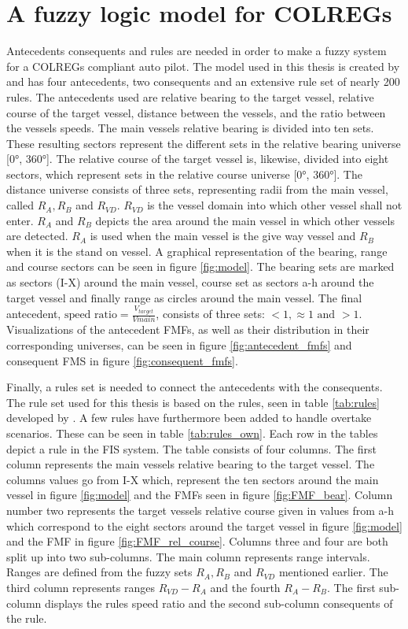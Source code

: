 \section{A fuzzy logic model for COLREGs}
\label{section:model}
Antecedents consequents and rules are needed in order to make a fuzzy system for a COLREGs compliant auto pilot. The model used in this thesis is created by \textcite{perera2012intelligent} and has four antecedents, two consequents and an extensive rule set of nearly 200 rules. The antecedents used are relative bearing to the target vessel, relative course of the target vessel, distance between the vessels, and the ratio between the vessels speeds. The main vessels relative bearing is divided into ten sets. These resulting sectors represent the different sets in the relative bearing universe [\ang{0}, \ang{360}]. The relative course of the target vessel is, likewise, divided into eight sectors, which represent sets in the relative course universe [\ang{0}, \ang{360}]. The distance universe consists of three sets, representing radii from the main vessel, called $R_A, R_B$ and $R_{VD}$. $R_{VD}$ is the vessel domain into which other vessel shall not enter. $R_A$ and $R_B$ depicts the area around the main vessel in which other vessels are detected. $R_A$ is used when the main vessel is the give way vessel and $R_B$ when it is the stand on vessel. A graphical representation of the bearing, range and course sectors can be seen in figure \ref{fig:model}. The bearing sets are marked as sectors (I-X) around the main vessel, course set as sectors a-h around the target vessel and finally range as circles around the main vessel. The final antecedent, $\text{speed ratio} =\frac{V_{target}}{V{main}}$, consists of three sets: $<1, \approx1 \text{ and } >1$.
Visualizations of the antecedent FMFs, as well as their distribution in their corresponding universes, can be seen in figure \ref{fig:antecedent_fmfs} and consequent FMS in figure \ref{fig:consequent_fmfs}.

Finally, a rules set is needed to connect the antecedents with the consequents. The rule set used for this thesis is based on the rules, seen in table \ref{tab:rules} developed by \textcite{perera2012intelligent}. A few rules have furthermore been added to handle overtake scenarios. These can be seen in table \ref{tab:rules_own}.
Each row in the tables depict a rule in the FIS system.
The table consists of four columns. The first column represents the main vessels relative bearing to the target vessel. The columns values go from I-X which, represent the ten sectors around the main vessel in figure \ref{fig:model} and the FMFs seen in figure \ref{fig:FMF_bear}. Column number two represents the target vessels relative course given in values from a-h which correspond to the eight sectors around the target vessel in figure \ref{fig:model} and the FMF in figure \ref{fig:FMF_rel_course}. Columns three and four are both split up into two sub-columns. The main column represents range intervals. Ranges are defined from the fuzzy sets $R_A, R_B$ and $R_{VD}$ mentioned earlier. The third column represents ranges $R_{VD}- R_A$ and the fourth $R_A-R_B$. The first sub-column displays the rules speed ratio and the second sub-column consequents of the rule.

